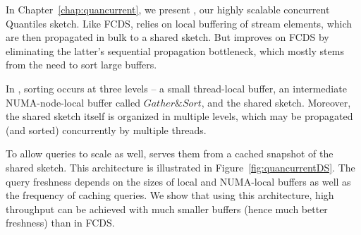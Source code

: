 In Chapter~\ref{chap:quancurrent}, we present \mysketch, our highly scalable concurrent Quantiles sketch.
Like FCDS, \mysketch relies on local buffering of stream elements, which are then propagated in bulk to a shared sketch.
But \mysketch improves on FCDS by eliminating the latter's sequential propagation bottleneck, which mostly stems from the need to sort large buffers.

In \mysketch, sorting occurs at three levels -- a small thread-local buffer, an intermediate \acrshort{NUMA}-node-local buffer called $\mathit{Gather\&Sort}$, and the shared sketch.
Moreover, the shared sketch itself is organized in multiple levels, which may be propagated (and sorted) concurrently by multiple threads.

To allow queries to scale as well, \mysketch serves them from a cached snapshot of the shared sketch.
This architecture is illustrated in Figure~\ref{fig:quancurrentDS}.
The query freshness depends on the sizes of local and NUMA-local buffers as well as the frequency of caching queries.
We show that using this architecture, high throughput can be achieved with much smaller buffers (hence much better freshness) than in FCDS.




